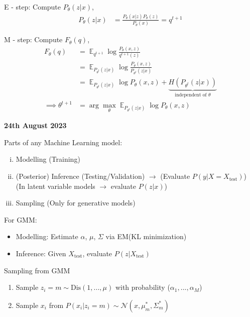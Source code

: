 \documentclass[11pt]{article}
\DeclareMathOperator*{\E}{\mathbb{E}}
\begin{document}
E - step: Compute $P_{\theta}(z|x)$,
\begin{align*}
  P_{\theta}(z|x) &= \frac{P_{\theta}(x|z) P_{\theta}(z)}{P_{\theta}(x)} = q^{t+1}
\end{align*}

M - step: Compute $F_{\theta}(q)$,
\begin{align*}
  F_{\theta}(q) &= \E_{q^{t+1}} \log \frac{P_{\theta}(x, z)}{q^{t+1}(z)} \\
                &= \E_{P_{\theta^t}(z|x)} \log \frac{P_{\theta}(x, z)}{P_{\theta^t}(z|x)} \\ 
                &= \E_{P_{\theta^t}(z|x)} \log P_{\theta}(x, z) + \underbrace{H(P_{\theta^t}(z | x))}_{\text{independent of } \theta} \\
  \implies \theta^{t+1} &= \arg\max_{\theta} \E_{P_{\theta^t}(z|x)} \log P_{\theta}(x, z)
\end{align*}


\textbf{24th August 2023}\vspace{1em}

\begin{framed}
  Parts of any Machine Learning model:
  \begin{enumerate}[(i)]
  \item Modelling (Training)
  \item (Posterior) Inference (Testing/Validation) $\rightarrow$ (Evaluate $P(y|X = X_{\text{test}})$) \\
    (In latent variable models $\rightarrow$ evaluate $P(z|x)$)
  \item Sampling (Only for generative models)
  \end{enumerate}
\end{framed}

\vspace{1em}
For GMM:
\begin{itemize}
\item Modelling: Estimate $\alpha$, $\mu$, $\Sigma$ via EM(KL minimization)
\item Inference: Given $X_{\text{test}}$, evaluate $P(z|X_{\text{test}})$
\end{itemize}

\vspace{1em}
Sampling from GMM
\begin{enumerate}
\item\label{item:4} Sample $z_i = m \sim \text{Dis}(1, ..., \mu)$ with probability ($\alpha_1, ..., \alpha_M$)
\item\label{item:5} Sample $x_i$ from $P(x_i | z_i=m) \sim \mathcal{N}(x, \mu_m^{*}, \Sigma_m^{*})$
\end{enumerate}
\end{document}
